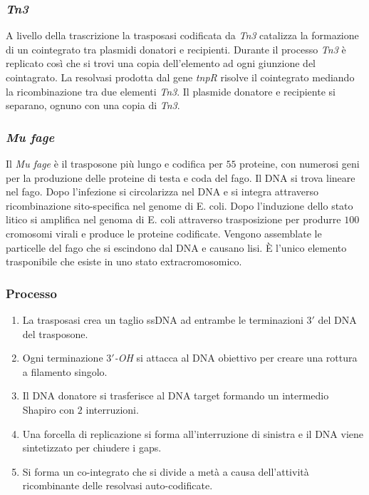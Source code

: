 		\subsubsection{\emph{Tn3}}
		A livello della trascrizione la trasposasi codificata da \emph{Tn3} catalizza la formazione di un cointegrato tra plasmidi donatori e recipienti.
		Durante il processo \emph{Tn3} \`e replicato cos\`i che si trovi una copia dell'elemento ad ogni giunzione del cointagrato.
		La resolvasi prodotta dal gene \emph{tnpR} risolve il cointegrato mediando la ricombinazione tra due elementi \emph{Tn3}.
		Il plasmide donatore e recipiente si separano, ognuno con una copia di \emph{Tn3}.

		\subsubsection{\emph{Mu fage}}
		Il \emph{Mu fage} \`e il trasposone pi\`u lungo e codifica per $55$ proteine, con numerosi geni per la produzione delle proteine di testa e coda del fago.
		Il DNA si trova lineare nel fago. 
		Dopo l'infezione si circolarizza nel DNA e si integra attraverso ricombinazione sito-specifica nel genome di E. coli.
		Dopo l'induzione dello stato litico si amplifica nel genoma di E. coli attraverso trasposizione per produrre $100$ cromosomi virali e produce le proteine codificate.
		Vengono assemblate le particelle del fago che si escindono dal DNA e causano lisi.
		\`E l'unico elemento trasponibile che esiste in uno stato extracromosomico.

		\subsubsection{Processo}
		\begin{enumerate}
			\item La trasposasi crea un taglio ssDNA ad entrambe le terminazioni $3'$ del DNA del trasposone.
			\item Ogni terminazione \emph{$3'$-OH} si attacca al DNA obiettivo per creare una rottura a filamento singolo.
			\item Il DNA donatore si trasferisce al DNA target formando un intermedio Shapiro con $2$ interruzioni.
			\item Una forcella di replicazione si forma all'interruzione di sinistra e il DNA viene sintetizzato per chiudere i gaps.
			\item Si forma un co-integrato che si divide a met\`a a causa dell'attivit\`a ricombinante delle resolvasi auto-codificate.
		\end{enumerate}


